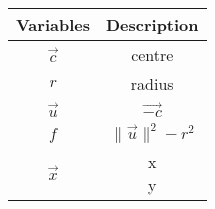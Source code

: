 \begin{tabular}[12pt]{ |c| c|}
    \hline
    \textbf{Variables} & \textbf{Description}\\ 
    \hline
    $\vec{c}$ & centre \\
    \hline
    $r$ & radius \\
    \hline
    $\vec{u}$ & $\vec{-c}$ \\
    \hline
    $f$ & $\lVert\vec{u}\rVert^2 - r^2$ \\
    \hline
 $\vec{x}$ & \myvec{x \\ y} \\
    \hline
\end{tabular}


